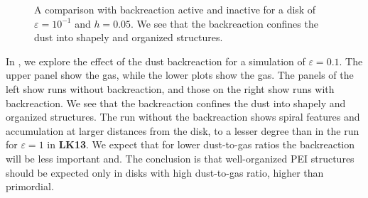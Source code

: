 \documentclass[onecolumn]{report}
\newcommand{\epsi}{\varepsilon}
\begin{document}
\begin{figure}
  \begin{center}
  \end{center}
  \caption{A comparison with backreaction active and inactive for a
    disk of $\varepsilon=10^{-1}$ and $h=0.05$. We see that the
    backreaction confines the dust into shapely and organized
    structures.}
  \label{fig:bkrk_comp}
\end{figure}  

In , we explore the effect of the dust backreaction for a simulation of $\epsi=0.1$. The upper panel show the gas, while the lower plots show the gas. The panels of the left show runs without backreaction, and those on the right show runs with backreaction. We see that the backreaction confines the dust into shapely and organized structures. The run without the backreaction shows spiral features and accumulation at larger distances from the disk, to a lesser degree than in the run for $\epsi=1$ in \textbf{LK13}. We expect that for lower dust-to-gas ratios the backreaction will be less important and. The conclusion is that well-organized PEI structures should be expected only in disks with high dust-to-gas ratio, higher than primordial.
\end{document}
